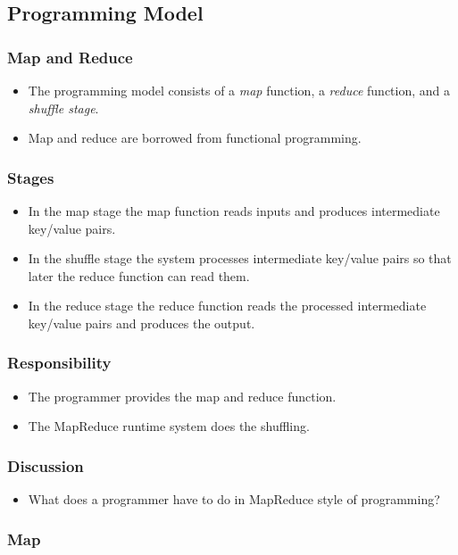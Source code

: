 \documentclass{beamer}
\begin{document}
\subsection{Programming Model}

\begin{frame}
  \frametitle{Map and Reduce}
  \begin{itemize}
  \item The programming model consists of a {\em map} function, a {\em
    reduce} function, and a {\em shuffle stage}.
  \item Map and reduce are borrowed from functional programming.
  \end{itemize}
\end{frame}

\begin{frame}
  \frametitle{Stages}
  \begin{itemize}
    \item In the map stage the map function reads inputs and produces
      intermediate key/value pairs.
    \item In the shuffle stage the system processes intermediate
      key/value pairs so that later the reduce function can read them.
    \item In the reduce stage the reduce function reads the processed
      intermediate key/value pairs and produces the output.
  \end{itemize}
\end{frame}

\begin{frame}
  \frametitle{Responsibility}
  \begin{itemize}
    \item The programmer provides the map and reduce function.
    \item The MapReduce runtime system does the shuffling.
  \end{itemize}
\end{frame}

\begin{frame}
  \frametitle{Discussion}
  \begin{itemize}
    \item What does a programmer have to do in MapReduce style of
      programming?
  \end{itemize}
\end{frame}

\subsubsection{Map}
\end{document}
